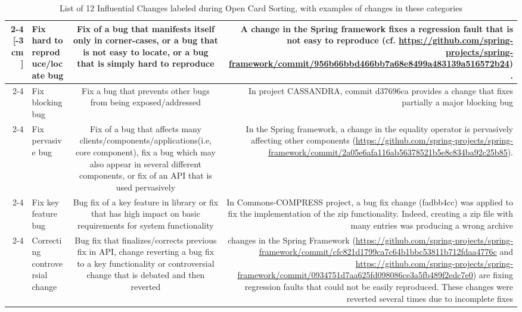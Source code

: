 \begin{table}
\scriptsize
	\begin{tabular} {r |l | c | r}
	\cline{2-4}
	\multirow{5}{*}[-3cm]{\rotatebox[origin=r]{90}{Corrective changes}} &Fix hard to reproduce/locate bug & \multicolumn{1}{p{4cm}|}{Fix of a bug that manifests itself only in corner-cases, or a bug that is not easy to locate, or a bug that is simply hard to reproduce} & \multicolumn{1}{p{5.5cm}}{A change in the Spring framework fixes a regression fault that is not easy to reproduce (cf. {\tiny \url{https://github.com/spring-projects/spring-framework/commit/956b66bbd466bb7a68e8499a483139a516572b24}}).}\\\cline{2-4}
&Fix blocking bug & \multicolumn{1}{p{4cm}|}{Fix a bug that prevents other bugs from being exposed/addressed} & \multicolumn{1}{p{5.5cm}}{In project CASSANDRA, commit d37696ca provides a change that fixes partially a major blocking bug}\\ \cline{2-4}
	&Fix pervasive bug & \multicolumn{1}{p{4cm}|}{Fix of a bug that affects many clients/components/applications(i.e, core component),  fix a bug which may also appear in several different components, or  fix of an API that is used pervasively} & \multicolumn{1}{p{5.5cm}}{In the Spring framework, a change in the equality operator is pervasively affecting other components ({\tiny \url{https://github.com/spring-projects/spring-framework/commit/2a05e6afa116ab56378521b5e8c834ba92c25b85}}).}\\ \cline{2-4}
	&Fix key feature bug & \multicolumn{1}{p{4cm}|}{Bug fix of a key feature in library or fix that has high impact on basic requirements for system functionality}& \multicolumn{1}{p{5.5cm}}{In Commons-COMPRESS project, a bug fix change (fadbb4cc) was applied to fix the implementation of the zip functionality. Indeed, creating a zip file with many entries was producing a wrong archive}\\ \cline{2-4}
	&Correcting controversial change & \multicolumn{1}{p{4cm}|}{Bug fix that finalizes/corrects previous fix in API, change reverting a bug fix to a key functionality or controversial change that is debated and then reverted} &  \multicolumn{1}{p{5.5cm}}{changes in the Spring Framework ({\tiny \url{https://github.com/spring-projects/spring-framework/commit/cfc821d1799ca7c64b1bbc53811b712fdaa4776c}} and  {\tiny \url{https://github.com/spring-projects/spring-framework/commit/0934751d7aa625fd098086ce3a5fb489f2edc7e0}}) are fixing regression faults that could not be easily reproduced. These changes were reverted several times due to incomplete fixes}\\ \hline \hline
		
	\end{tabular}
	\caption{List of 12 Influential Changes labeled during Open Card Sorting, with examples of changes in these categories}
	\label{tab:ics}
\end{table}


